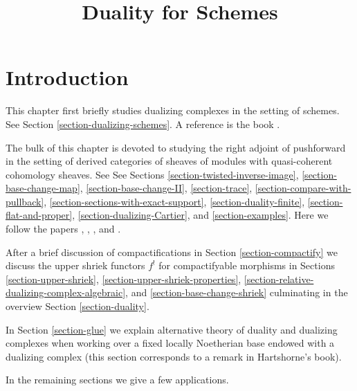 

%


\title{Duality for Schemes}


\maketitle

\label{section-phantom}

\tableofcontents

\section{Introduction}
\label{section-introduction}

\noindent
This chapter first briefly studies dualizing complexes in the
setting of schemes.
See Section \ref{section-dualizing-schemes}.
A reference is the book \cite{RD}.

\medskip\noindent
The bulk of this chapter is devoted to studying the right adjoint
of pushforward in the setting of derived categories of sheaves
of modules with quasi-coherent cohomology sheaves. See
See Sections
\ref{section-twisted-inverse-image},
\ref{section-base-change-map},
\ref{section-base-change-II},
\ref{section-trace},
\ref{section-compare-with-pullback},
\ref{section-sections-with-exact-support},
\ref{section-duality-finite},
\ref{section-flat-and-proper},
\ref{section-dualizing-Cartier}, and
\ref{section-examples}.
Here we follow the papers 
\cite{Neeman-Grothendieck}, \cite{LN},
\cite{Lipman-notes}, and \cite{Neeman-improvement}.

\medskip\noindent
After a brief discussion of compactifications in
Section \ref{section-compactify}
we discuss the upper shriek functors $f^!$ for
compactifyable morphisms in
Sections \ref{section-upper-shriek},
\ref{section-upper-shriek-properties},
\ref{section-relative-dualizing-complex-algebraic}, and
\ref{section-base-change-shriek}
culminating in the overview Section
\ref{section-duality}.

\medskip\noindent
In Section \ref{section-glue}
we explain alternative theory of duality and dualizing
complexes when working over a fixed locally Noetherian
base endowed with a dualizing complex (this section corresponds
to a remark in Hartshorne's book).

\medskip\noindent
In the remaining sections we give a few applications.








